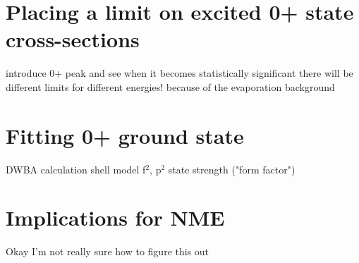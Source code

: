 \section{Placing a limit on excited 0+ state cross-sections}
introduce 0+ peak and see when it becomes statistically significant
there will be different limits for different energies!  because of the evaporation background

\section{Fitting 0+ ground state}
DWBA calculation
shell model
f$^2$, p$^2$ state strength ("form factor")

\section{Implications for \zvbb NME}
Okay I'm not really sure how to figure this out

%
% 
% 
